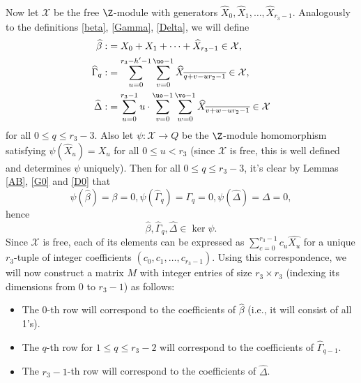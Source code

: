 \paragraph*{}
Now let $\mathcal{X}$ be the free $\Z$-module with generators $\widehat{X}_0,\widehat{X}_1,\dots,\widehat{X}_{r_3-1}$.
Analogously to the definitions \eqref{beta}, \eqref{Gamma}, \eqref{Delta}, we will define 
\begin{align*}
\widehat{\beta}:&=X_0+X_1+\dots+\widehat{X}_{r_3-1}\in \mathcal{X},\\
\widehat{\Gamma}_q:&=\sum_{u=0}^{r_3-h'-1}\sum_{v=0}^{\uo-1}\widehat{X}_{\overline{q+v-ur_2-1}}\in \mathcal{X},\\
\widehat{\Delta}:&=\sum_{u=0}^{r_3-1}u\cdot\sum_{v=0}^{\uo-1} \sum _{w=0}^{\vo-1} \widehat{X}_{\overline{v+w-ur_2-1}}\in \mathcal{X}
\end{align*}
for all $0\le q \le r_3-3$. Also let $\psi:\mathcal{X}\to Q$ be the $\Z$-module homomorphism satisfying $\psi(\widehat{X}_u)=X_u$ for all $0\le u <r_3$ (since $\mathcal{X}$ is free, this is well defined and determines $\psi$ uniquely). Then for all $0\le q \le r_3-3$, it's clear by Lemmas \ref{AB}, \ref{G0} and \ref{D0} that $$\psi(\widehat{\beta})=\beta=0, \psi(\widehat{\Gamma}_q)=\Gamma_q=0, \psi(\widehat{\Delta})=\Delta=0,$$
hence 
\begin{equation}\label{kerpsi}
\widehat{\beta}, \widehat{\Gamma}_q, \widehat{\Delta} \in \ker \psi.
\end{equation}
Since $\mathcal{X}$ is free, each of its elements can be expressed as $\sum_{c=0}^{r_3-1}c_u\widehat{X_u}$ for a unique $r_3$-tuple of integer coefficients $(c_0,c_1,\dots,c_{r_3-1})$. Using this correspondence, we will now construct a matrix $M$ with integer entries of size $r_3\times r_3$ (indexing its dimensions from $0$ to $r_3-1$) as follows:
\begin{itemize}
\item The $0$-th row will correspond to the coefficients of $\widehat{\beta}$ (i.e., it will consist of all 1's).
\item The $q$-th row for $1\leq q\leq r_3-2$ will correspond to the coefficients of $\widehat{\Gamma}_{q-1}$.
\item The $r_3-1$-th row will correspond to the coefficients of $\widehat{\Delta}$.
\end{itemize}

